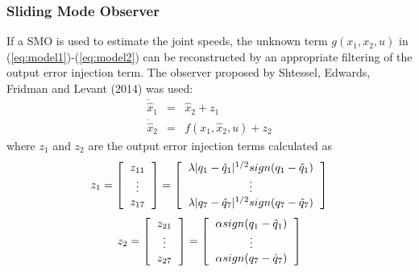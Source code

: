 \documentclass[9pt,spanish,aspectratio=1610]{beamer}
\begin{document}
\begin{frame}\frametitle{Sliding Mode Observer}
  If a SMO is used to estimate the joint speeds, the unknown term $g(x_1, x_2, u)$ in (\ref{eq:model1})-(\ref{eq:model2}) can be reconstructed by an appropriate filtering of the output error injection term. The observer proposed by Shtessel, Edwards, Fridman and Levant (2014) was used:
  \begin{eqnarray}
    \dot{\hat{x}}_1 &=& \hat{x}_2 + z_1\label{eq:observer1}\\
    \dot{\hat{x}}_2 &=& f(x_1, \hat{x}_2, u) + z_2\label{eq:observer2}
  \end{eqnarray}
  where $z_1$ and $z_2$ are the output error injection terms calculated as
  \begin{equation*}z_1 =
    \left[\begin{tabular}{c}
        $z_{11}$\\
        $\vdots$\\
        $z_{17}$
    \end{tabular}\right] = 
    \left[\begin{tabular}{c}
        $\lambda\vert q_1 - \hat{q}_1\vert ^{1/2}sign(q_1 - \hat{q}_1)$ \\
        $\vdots$\\
        $\lambda\vert q_7 - \hat{q}_7\vert ^{1/2}sign(q_7 - \hat{q}_7)$
    \end{tabular}\right]
\end{equation*}
\begin{equation*}z_2 =
  \left[\begin{tabular}{c}
      $z_{21}$\\
      $\vdots$\\
      $z_{27}$
    \end{tabular}\right] = 
  \left[\begin{tabular}{c}
      $\alpha sign(q_1 - \hat{q}_1)$ \\
      $\vdots$\\
      $\alpha sign(q_7 - \hat{q}_7)$
    \end{tabular}\right]
\end{equation*}
\end{frame}
\end{document}
